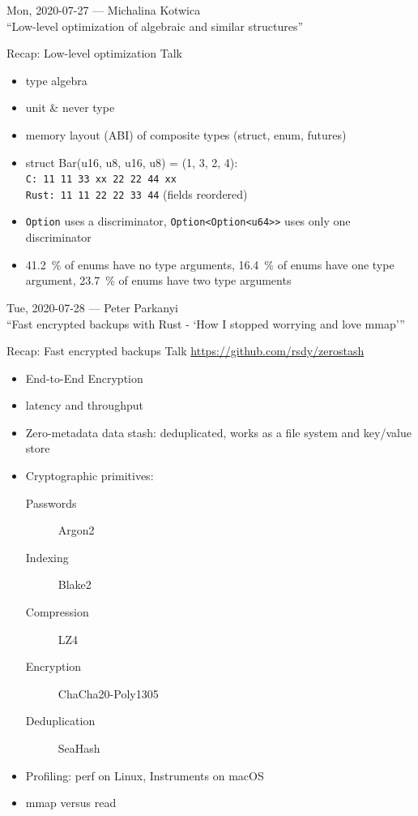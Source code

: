 \documentclass{beamer}
\begin{document}
\begin{frame}[standout]
  Mon, 2020-07-27 --- Michalina Kotwica \\
  \enquote{Low-level optimization of algebraic and similar structures}
\end{frame}

\begin{frame}[fragile]{Recap: Low-level optimization Talk}
  \begin{itemize}
    \item type algebra
    \item unit \& never type
    \item memory layout (ABI) of composite types (struct, enum, futures)
    \item struct Bar(u16, u8, u16, u8) = (1, 3, 2, 4): \\
          \texttt{C: \hspace{13pt} 11 11 33 xx 22 22 44 xx} \\
          \texttt{Rust: 11 11 22 22 33 44}  (fields reordered)
    \item \texttt{Option} uses a discriminator, \texttt{Option<Option<u64>>} uses only one discriminator
    \item 41.2~\% of enums have no type arguments, 16.4~\% of enums have one type argument, 23.7~\% of enums have two type arguments
  \end{itemize}
\end{frame}

\begin{frame}[standout]
  Tue, 2020-07-28 --- Peter Parkanyi \\
  \enquote{Fast encrypted backups with Rust - \enquote{How I stopped worrying and love mmap}}
\end{frame}

\begin{frame}[fragile]{Recap: Fast encrypted backups Talk}
  \url{https://github.com/rsdy/zerostash}
  \begin{itemize}
    \item End-to-End Encryption
    \item latency and throughput
    \item Zero-metadata data stash: deduplicated, works as a file system and key/value store
    \item Cryptographic primitives:
      \begin{description}
        \item[Passwords] Argon2
        \item[Indexing] Blake2
        \item[Compression] LZ4
        \item[Encryption] ChaCha20-Poly1305
        \item[Deduplication] SeaHash
      \end{description}
    \item Profiling: perf on Linux, Instruments on macOS
    \item mmap versus read
  \end{itemize}
\end{frame}
\end{document}
